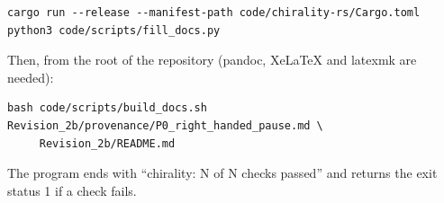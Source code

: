\documentclass[
  10pt,
]{article}
\begin{document}
\begin{verbatim}
cargo run --release --manifest-path code/chirality-rs/Cargo.toml
python3 code/scripts/fill_docs.py
\end{verbatim}

Then, from the root of the repository (pandoc, XeLaTeX and latexmk are
needed):

\begin{verbatim}
bash code/scripts/build_docs.sh Revision_2b/provenance/P0_right_handed_pause.md \
     Revision_2b/README.md
\end{verbatim}

The program ends with ``chirality: N of N checks passed'' and returns
the exit status 1 if a check fails.
\end{document}
